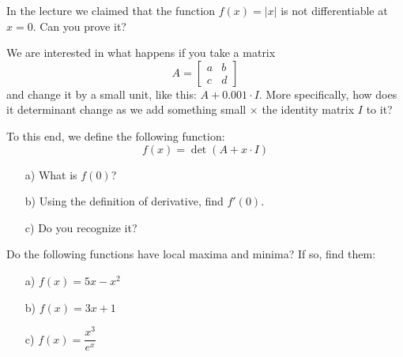 \medskip





\begin{problem}
In the lecture we claimed that the function $f(x)=|x|$ is not differentiable at $x=0$. Can you prove it?



\end{problem}

\medskip


\begin{problem}
    
We are interested in what happens if you take a matrix
\[
A = \begin{bmatrix}
    a & b \\ c & d
\end{bmatrix}
\]
and change it by a small unit, like this: $A+0.001\cdot I$.  More specifically, how does it determinant change as we add something small $\times$ the identity matrix $I$ to it? 

To this end, we define the following function:
\[
f(x) = \det(A + x \cdot I)
\]

\begin{enumerate}
    \item[a) ] What is $f(0)$?
    \item[b) ] Using the definition of derivative, find $f'(0)$.
    \item[c) ] Do you recognize it?
\end{enumerate}
\end{problem}

\medskip


\begin{problem}
Do the following functions have  local maxima and minima? If so, find them:
\begin{enumerate}
    \item[a) ] $f(x)=5x-x^2$
    \item[b) ] $f(x)=3x+1$
    \item[c) ] $f(x)=\dfrac{x^3}{e^x}$
    \end{enumerate}
\end{problem}

\medskip

